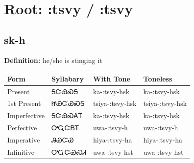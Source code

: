 \documentclass{article}%
\begin{document}
%
\normalsize%
\section*{Root: :tsvy / :tsvy}%
\subsection*{sk-h}%
\textbf{Definition: }%
he/she is stinging it%
\\[0.5em]%
\begin{tabular}{|l|l|l|l|}%
\hline%
\textbf{Form}&\textbf{Syllabary}&\textbf{With Tone}&\textbf{Toneless}\\%
\hline%
Present&ᎦᏨᏯᏍᎦ&ka{-}:tsvy{-}hsk&ka{-}:tsvy{-}hsk\\%
1st Present&ᏥᏯᏨᏯᏍᎦ&tsiya{-}:tsvy{-}hsk&tsiya{-}:tsvy{-}hsk\\%
Imperfective&ᎦᏨᏯᏍᎪᎢ&ka{-}:tsvy{-}hsk&ka{-}:tsvy{-}hsk\\%
Perfective&ᎤᏩᏨᏴᎢ&uwa{-}:tsvy{-}h&uwa{-}:tsvy{-}h\\%
Imperative&ᎯᏯᏨᏯ&hiya{-}:tsvy{-}ha&hiya{-}:tsvy{-}ha\\%
Infinitive&ᎤᏩᏨᏯᏍᏗ&uwa{-}:tsvy{-}hst&uwa{-}:tsvy{-}hst\\%
\hline%
\end{tabular}%
\\[1em]%
\end{document}
